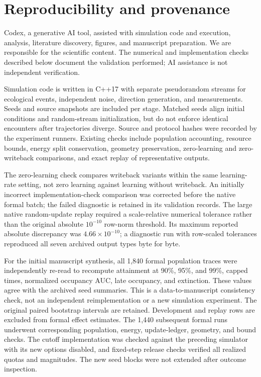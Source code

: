 \documentclass[11pt]{article}
\begin{document}
\section{Reproducibility and provenance}
Codex, a generative AI tool, assisted with simulation code and execution, analysis, literature discovery, figures, and manuscript preparation. We are responsible for the scientific content. The numerical and implementation checks described below document the validation performed; AI assistance is not independent verification.

Simulation code is written in C++17 with separate pseudorandom streams for ecological events, independent noise, direction generation, and measurements. Seeds and source snapshots are included per stage. Matched seeds align initial conditions and random-stream initialization, but do not enforce identical encounters after trajectories diverge. Source and protocol hashes were recorded by the experiment runners. Existing checks include population accounting, resource bounds, energy split conservation, geometry preservation, zero-learning and zero-writeback comparisons, and exact replay of representative outputs.

The zero-learning check compares writeback variants within the same learning-rate setting, not zero learning against learning without writeback. An initially incorrect implementation-check comparison was corrected before the native formal batch; the failed diagnostic is retained in its validation records. The large native random-update replay required a scale-relative numerical tolerance rather than the original absolute $10^{-10}$ row-norm threshold. Its maximum reported absolute discrepancy was $4.66\times10^{-10}$; a diagnostic run with row-scaled tolerances reproduced all seven archived output types byte for byte.

For the initial manuscript synthesis, all 1,840 formal population traces were independently re-read to recompute attainment at 90\%, 95\%, and 99\%, capped times, normalized occupancy AUC, late occupancy, and extinction. These values agree with the archived seed summaries. This is a data-to-manuscript consistency check, not an independent reimplementation or a new simulation experiment. The original paired bootstrap intervals are retained. Development and replay rows are excluded from formal effect estimates. The 1,440 subsequent formal runs underwent corresponding population, energy, update-ledger, geometry, and bound checks. The cutoff implementation was checked against the preceding simulator with its new options disabled, and fixed-step release checks verified all realized quotas and magnitudes. The new seed blocks were not extended after outcome inspection.
\end{document}
